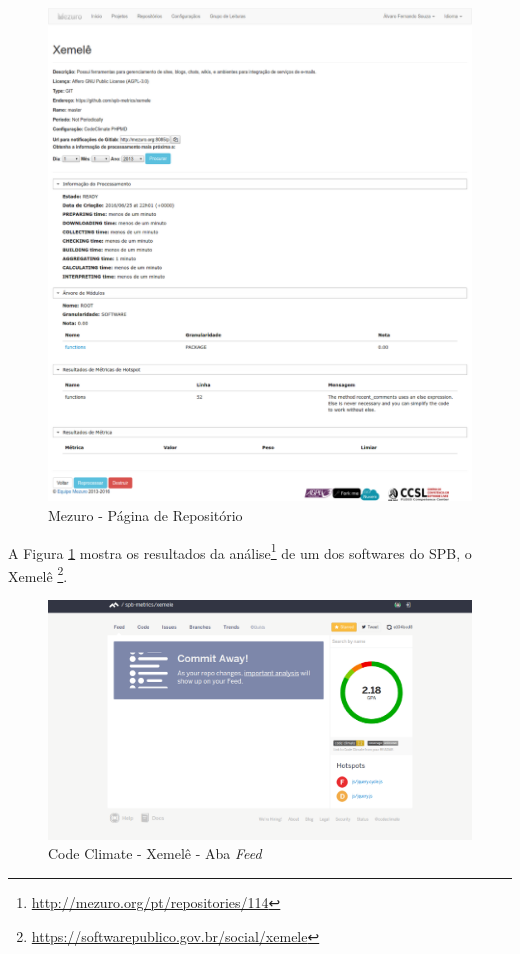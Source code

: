 \begin{figure}[!htb]
	\centering
    \includegraphics[keepaspectratio=true,scale=0.3]
    {figuras/mezuro-repositorio-view.eps}
  \caption{Mezuro - Página de Repositório}
	\label{fig:mezuro-repositorio-view-xemele}
\end{figure}

A Figura \ref{fig:mezuro-repositorio-view-xemele}
mostra os resultados da análise\footnote{\url{http://mezuro.org/pt/repositories/114}}
de um dos softwares do SPB, o Xemelê
\footnote{\url{https://softwarepublico.gov.br/social/xemele}}.

\begin{figure}[!htb]
	\centering
    \includegraphics[keepaspectratio=true,scale=0.3]
    {figuras/codeclimate_feed.eps}
  \caption{Code Climate - Xemelê - Aba \textit{Feed}}
	\label{fig:codeclimate_feed}
\end{figure}

